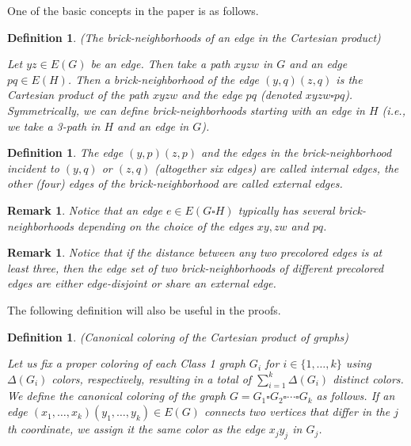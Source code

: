 \documentclass[a4paper,12pt]{article}
\newtheorem{remark}[theorem]{\bf Remark}
\newtheorem{defi}[theorem]{\bf Definition}
\begin{document}
One of the basic concepts in the paper is as follows.

\begin{defi} (The brick-neighborhoods of an edge in the Cartesian product)

    \textup{Let $yz \in E(G)$ be an edge. Then take a path $xyzw$ in $G$ and an edge $pq \in E(H)$. Then a \textit{brick-neighborhood of the edge $(y,q)(z,q)$} is the Cartesian product of the path $xyzw$ and the edge $pq$ (denoted $xyzw \square pq$). Symmetrically, we can define brick-neighborhoods starting with an edge in $H$ (i.e., we take a 3-path in $H$ and an edge in $G$).}
\end{defi}

 \begin{defi}
    \textup{The edge $(y,p)(z,p)$ and the edges in the brick-neighborhood incident to $(y,q)$ or $(z,q)$ (altogether six edges) are called \textit{internal edges}, the other (four) edges of the brick-neighborhood are called \textit{external edges}.}
\end{defi}

\begin{remark}
    \textup{Notice that an edge $e \in E(G \square H)$ typically has several brick-neigh\-bor\-hoods depending on the choice of the edges $xy, zw$ and $pq$.}
\end{remark}

\begin{remark} \label{internal-external}
    \textup{Notice that if the distance between any two precolored edges is at least three, then the edge set of two brick-neighborhoods of different precolored edges are either edge-disjoint or share an external edge.}
\end{remark}

The following definition will also be useful in the proofs.

\begin{defi}(Canonical coloring of the Cartesian product of graphs)

    \textup{Let us fix a proper coloring of each Class 1 graph $G_i$ for $i \in \{1, \dots, k\}$ using $\Delta(G_i)$ colors, respectively, resulting in a total of $\sum_{i=1}^k \Delta(G_i)$ distinct colors. We define the canonical coloring of the graph $G = G_1 \square G_2 \square \cdots \square G_k$ as follows. If an edge $(x_1,\dots,x_k)(y_1,\dots,y_k) \in E(G)$ connects two vertices that differ in the $j$th coordinate, we assign it the same color as the edge $x_jy_j$ in $G_j$.} 
\end{defi}
\end{document}
